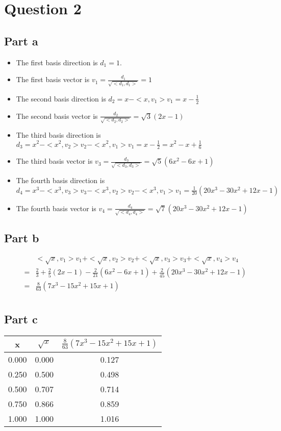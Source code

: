 \section*{Question 2}
\subsection*{Part a}
\begin{itemize}
    \item The first basis direction is $ d_1 = 1 $.
    \item The first basis vector is $ v_1 = \frac{d_1}{\sqrt{<d_1, d_1>}} = 1 $
    \item The second basis direction is $ d_2 = x - <x, v_1> v_1 = x - \frac{1}{2} $
    \item The second basis vector is $ \frac{d_2}{\sqrt{<d_2, d_2>}} = \sqrt{3}(2x - 1) $
    \item The third basis direction is $ d_3 = x^2 - <x^2, v_2> v_2 - <x^2, v_1> v_1 = x - \frac{1}{2} = x^2 - x + \frac{1}{6} $
    \item The third basis vector is $ v_3 = \frac{d_3}{\sqrt{<d_3, d_3>}} = \sqrt{5}(6x^2 - 6x + 1) $
    \item The fourth basis direction is $ d_4 = x^3 - <x^3, v_3> v_3 - <x^3, v_2> v_2  - <x^3, v_1> v_1 = \frac{1}{20}(20x^3 - 30x^2 + 12x - 1) $
    \item The fourth basis vector is $ v_4 = \frac{d_4}{\sqrt{<d_4, d_4>}} = \sqrt{7}(20x^3 - 30x^2 + 12x - 1) $
\end{itemize}
\subsection*{Part b}
\begin{eqnarray*}
  & & <\sqrt{x}, v_1> v_1 + <\sqrt{x}, v_2> v_2 + <\sqrt{x}, v_3> v_3 + <\sqrt{x}, v_4> v_4 \\
  &=& \frac{2}{3} + \frac{2}{5}(2x - 1) - \frac{2}{21}(6x^2 - 6x + 1) + \frac{2}{45}(20x^3 - 30x^2 + 12x - 1) \\
  &=& \frac{8}{63} (7 x^3 - 15 x^2 + 15 x + 1) \\
\end{eqnarray*}
\subsection*{Part c}
\begin{tabular}{ccc}
x & $ \sqrt{x} $ & $ \frac{8}{63} (7 x^3 - 15 x^2 + 15 x + 1) $ \\
\hline
0.000 & 0.000 & 0.127 \\
0.250 & 0.500 & 0.498 \\
0.500 & 0.707 & 0.714 \\
0.750 & 0.866 & 0.859 \\
1.000 & 1.000 & 1.016 
\end{tabular}
